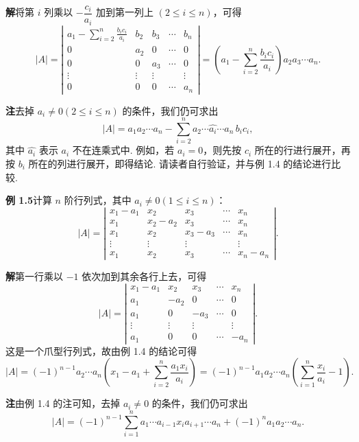 \documentclass[UTF8, 12pt, fontset=fandol, oneside]{ctexart}
\begin{document}
\noindent\textbf{解}\quad 将第 $i$ 列乘以 $-\dfrac{c_i}{a_i}$ 加到第一列上 $(2\le i\le n)$，可得
\[
|A|=
\left|\begin{array}{ccccc}
a_1-\displaystyle\sum_{i=2}^n\frac{b_ic_i}{a_i} & b_2 & b_3 & \cdots & b_n\\
0 & a_2 & 0 & \cdots & 0\\
0 & 0 & a_3 & \cdots & 0\\
\vdots & \vdots & \vdots &        & \vdots\\
0 & 0 & 0 & \cdots & a_n
\end{array}\right|
=\left(a_1-\sum_{i=2}^n\frac{b_ic_i}{a_i}\right)a_2a_3\cdots a_n.
\]

\noindent\textbf{注}\quad 去掉 $a_i\ne0(2\le i\le n)$ 的条件，我们仍可求出
\[
|A|=a_1a_2\cdots a_n-\sum_{i=2}^n a_2\cdots\widehat{a_i}\cdots a_n\,b_ic_i,
\]
其中 $\widehat{a_i}$ 表示 $a_i$ 不在连乘式中. 例如，若 $a_i=0$，则先按 $c_i$ 所在的行进行展开，再按 $b_i$ 所在的列进行展开，即得结论. 请读者自行验证，并与例 1.4 的结论进行比较.

\noindent\textbf{例 1.5}\quad 计算 $n$ 阶行列式，其中 $a_i\ne0(1\le i\le n)$：
\[
|A|=\left|\begin{array}{ccccc}
x_1-a_1 & x_2 & x_3 & \cdots & x_n\\
x_1 & x_2-a_2 & x_3 & \cdots & x_n\\
x_1 & x_2 & x_3-a_3 & \cdots & x_n\\
\vdots & \vdots & \vdots &        & \vdots\\
x_1 & x_2 & x_3 & \cdots & x_n-a_n
\end{array}\right|.
\]

\noindent\textbf{解}\quad 第一行乘以 $-1$ 依次加到其余各行上去，可得
\[
|A|=\left|\begin{array}{ccccc}
x_1-a_1 & x_2 & x_3 & \cdots & x_n\\
a_1 & -a_2 & 0 & \cdots & 0\\
a_1 & 0 & -a_3 & \cdots & 0\\
\vdots & \vdots & \vdots &        & \vdots\\
a_1 & 0 & 0 & \cdots & -a_n
\end{array}\right|.
\]
这是一个爪型行列式，故由例 1.4 的结论可得
\[
|A|=(-1)^{n-1}a_2\cdots a_n\left(x_1-a_1+\sum_{i=2}^n\frac{a_1x_i}{a_i}\right)
=(-1)^{n-1}a_1a_2\cdots a_n\left(\sum_{i=1}^n\frac{x_i}{a_i}-1\right).
\]

\noindent\textbf{注}\quad 由例 1.4 的注可知，去掉 $a_i\ne0$ 的条件，我们仍可求出
\[
|A|=(-1)^{n-1}\sum_{i=1}^n a_1\cdots a_{i-1}x_ia_{i+1}\cdots a_n
+(-1)^n a_1a_2\cdots a_n.
\]
\end{document}
